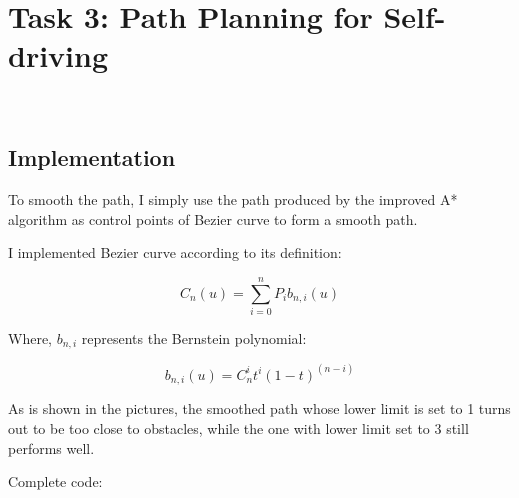 \documentclass[aps,letterpaper,10pt]{revtex4}
\begin{document}
\section{Task 3: Path Planning for Self-driving}
\begin{figure}[H]
	  \centering
	  \\
	  \caption{}
	  \label{fig:oscil}
	\end{figure}
\subsection{Implementation}
To smooth the path, I simply use the path produced by the improved A* algorithm as control points of Bezier curve  to form a smooth path.

\vspace{3mm}
I implemented Bezier curve according to its definition:

\begin{center}
    \begin{equation}
        C_n(u) = \sum_{i=0}^n P_i b_{n,i}(u)
    \end{equation}
\end{center}

Where, $b_{n,i}$ represents the Bernstein polynomial:

\begin{center}
    \begin{equation}
        b_{n,i}(u) = C_n^i t^i (1-t)^(n-i)
    \end{equation}
\end{center}
\vspace{5mm}
	
	\vspace{3mm}

\vspace{3mm}
As is shown in the pictures, the smoothed path whose lower limit is set to 1 turns out to be too close to obstacles, while the one with lower limit set to 3 still performs well. 

\vspace{3mm}
Complete code:
\vspace{5mm}
	
	\vspace{3mm}
\end{document}
